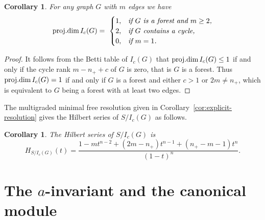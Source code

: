\documentclass[12pt]{amsart}
\newtheorem{Corollary}[Theorem]{Corollary}
\def\pd{\textup{proj.dim}}
\begin{document}
\begin{Corollary}\label{cor-pd}
For any graph $G$ with $m$ edges we have
$$\pd \, I_c(G) =\ \begin{cases}
			1,&\textit{if $G$ is a forest and $m\geq 2$,}\\
			2,&\textit{if $G$ contains a cycle,}\\
			0,&\textit{if $m=1$.}
		\end{cases}$$
\end{Corollary}

\begin{proof}
It follows from the Betti table of $I_c(G)$ that $\pd \, I_c(G)\leq 1$ if and only if the cycle rank $m-n_++c$ of $G$ is zero, that is $G$ is a forest. Thus $\pd \, I_c(G)=1$ if and only if  $G$ is a forest and either $c>1$ or $2m\neq n_+$, which is equivalent to $G$ being a forest with at least two edges.
\end{proof} 



The multigraded minimal free resolution given in Corollary~\ref{cor:explicit-resolution} gives the  Hilbert series of $S/I_c(G)$ as follows. 

\begin{Corollary}\label{cor:hilbert}
The Hilbert series of $S/I_c(G)$ is
$$
H_{S/I_c(G)}(t)
=
\frac{
1-mt^{n-2}+(2m-n_+)t^{n-1}+(n_+-m-1)t^n
}{(1-t)^n}.
$$
\end{Corollary}




\section{The $a$-invariant and the canonical module} \label{three}
\end{document}
